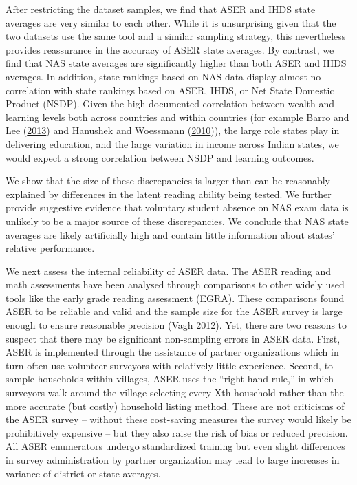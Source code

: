 \documentclass[
  11pt,
]{article}
\begin{document}
After restricting the dataset samples, we find that ASER and IHDS state averages are very similar to each other. While it is unsurprising given that the two datasets use the same tool and a similar sampling strategy, this nevertheless provides reassurance in the accuracy of ASER state averages. By contrast, we find that NAS state averages are significantly higher than both ASER and IHDS averages. In addition, state rankings based on NAS data display almost no correlation with state rankings based on ASER, IHDS, or Net State Domestic Product (NSDP). Given the high documented correlation between wealth and learning levels both across countries and within countries (for example Barro and Lee (\protect\hyperlink{ref-barro2013new}{2013}) and Hanushek and Woessmann (\protect\hyperlink{ref-hanushek2010education}{2010})), the large role states play in delivering education, and the large variation in income across Indian states, we would expect a strong correlation between NSDP and learning outcomes.

We show that the size of these discrepancies is larger than can be reasonably explained by differences in the latent reading ability being tested. We further provide suggestive evidence that voluntary student absence on NAS exam data is unlikely to be a major source of these discrepancies. We conclude that NAS state averages are likely artificially high and contain little information about states' relative performance.

We next assess the internal reliability of ASER data. The ASER reading and math assessments have been analysed through comparisons to other widely used tools like the early grade reading assessment (EGRA). These comparisons found ASER to be reliable and valid and the sample size for the ASER survey is large enough to ensure reasonable precision (Vagh \protect\hyperlink{ref-vagh2012validating}{2012}). Yet, there are two reasons to suspect that there may be significant non-sampling errors in ASER data. First, ASER is implemented through the assistance of partner organizations which in turn often use volunteer surveyors with relatively little experience. Second, to sample households within villages, ASER uses the ``right-hand rule,'' in which surveyors walk around the village selecting every Xth household rather than the more accurate (but costly) household listing method. These are not criticisms of the ASER survey -- without these cost-saving measures the survey would likely be prohibitively expensive -- but they also raise the risk of bias or reduced precision. All ASER enumerators undergo standardized training but even slight differences in survey administration by partner organization may lead to large increases in variance of district or state averages.
\end{document}
